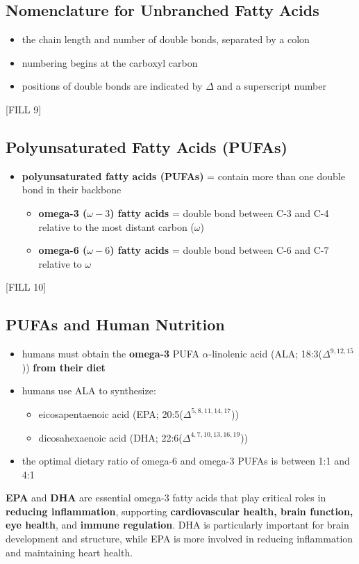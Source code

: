 \documentclass[10pt]{article}
\begin{document}
\subsection*{Nomenclature for Unbranched Fatty Acids}
\begin{itemize}
    \item the chain length and number of double bonds, separated by a colon
    \item numbering begins at the carboxyl carbon
    \item positions of double bonds are indicated by $\Delta$ and a superscript number
\end{itemize}
\begin{center}
    [FILL 9]
\end{center}

\subsection*{Polyunsaturated Fatty Acids (PUFAs)}
\begin{itemize}
    \item \textbf{polyunsaturated fatty acids (PUFAs)} = contain more than one double bond in their backbone
    \begin{itemize}
        \item \textbf{omega-3 ($\omega-3$) fatty acids} = double bond between C-3 and C-4 relative to the most distant carbon ($\omega$)
        \item \textbf{omega-6 ($\omega-6$) fatty acids} = double bond between C-6 and C-7 relative to $\omega$
    \end{itemize}
\end{itemize}
\begin{center}
    [FILL 10]
\end{center}

\subsection*{PUFAs and Human Nutrition}
\begin{itemize}
    \item humans must obtain the \textbf{omega-3} PUFA $\alpha$-linolenic acid (ALA; 18:3($\Delta^{9, 12, 15}$)) \textbf{from their diet}
    \item humans use ALA to synthesize:
    \begin{itemize}
        \item eicosapentaenoic acid (EPA; 20:5($\Delta^{5, 8, 11, 14, 17}$))
        \item dicosahexaenoic acid (DHA; 22:6($\Delta^{4, 7, 10, 13, 16, 19}$))
    \end{itemize}
    \item the optimal dietary ratio of omega-6 and omega-3 PUFAs is between 1:1 and 4:1
\end{itemize}
\textbf{EPA} and \textbf{DHA} are essential omega-3 fatty acids that play critical roles in \textbf{reducing inflammation}, supporting \textbf{cardiovascular health, brain function, eye health}, and \textbf{immune regulation}.  DHA is particularly important for brain development and structure, while EPA is more involved in reducing inflammation and maintaining heart health.
\end{document}
